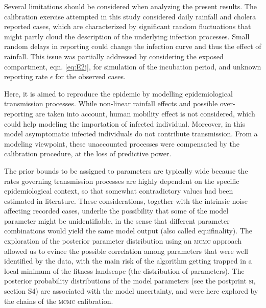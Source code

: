 Several limitations should be considered when analyzing the present results. The calibration exercise attempted in this study considered daily rainfall and cholera reported cases, which are characterized by significant random fluctuations that might partly cloud the description of the underlying infection processes. 
Small random delays in reporting could change the infection curve and thus the effect of rainfall. This issue was partially addressed by considering the exposed compartment, eqn. \eqref{eq:E2j}, for simulation of the incubation period, and unknown reporting rate $\epsilon$ for the observed cases.

Here, it is aimed to reproduce the epidemic by modelling epidemiological transmission processes. %
While non-linear rainfall effects and possible over-reporting are taken into account, human mobility effect\cite[-4\baselineskip]{Gatto:GeneralizedReproductionNumbers:2012,Bertuzzo:SpatiallyExplicitModels:2010,Mari:PredictiveAbilityMechanistic:2015,Perez-Saez:ClimatedrivenEndemicCholera:2017} is not considered, which could help modeling the importation of infected individual.  Moreover, in this model asymptomatic infected individuals do not contribute transmission. From a modeling viewpoint, these unaccounted processes were compensated by the calibration procedure, at the loss of predictive power.

The prior bounds to be assigned to parameters are typically wide\cite{Akman:ExaminationModelsCholera:2016} because the rates governing transmission processes are highly dependent on the specific epidemiological context, so that somewhat contradictory values had been estimated in literature. These considerations, together with the intrinsic noise affecting recorded cases, underlie the possibility that some of the model parameter might be unidentifiable\cite{Eisenberg:IdentifiabilityEstimationMultiple:2013}, in the sense that different parameter combinations would yield the same model output (also called equifinality). 
The exploration of the posterior parameter distribution using an \textsc{mcmc} approach allowed us to evince the possible correlation among parameters that were well identified by the data, with the main risk of the algorithm getting trapped in a local minimum of the fitness landscape (the distribution of parameters). The posterior probability distributions of the model parameters (see the postprint \textsc{si}, section S4) are associated with the model uncertainty, and were here explored by the chains of the \textsc{mcmc} calibration.

